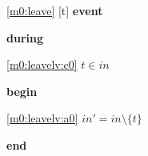 \noindent \ref{m0:leave} [t] \textbf{event}
\begin{block}
\item \textbf{during}
\begin{block}
\item[ \eqref{m0:leavelv:c0} ]$t \in in $ %
\end{block}
\item \textbf{begin}
\begin{block}
\item[ \eqref{m0:leavelv:a0} ]$in' = in \setminus \{ t \} $ %
\end{block}
\item \textbf{end} \\
\end{block}
